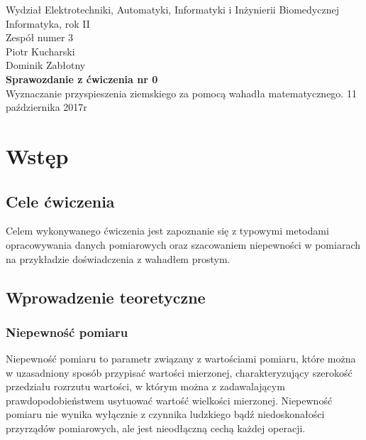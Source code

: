 \documentclass[a4paper,12pts]{article}
\begin{document}
	\thispagestyle{empty}
	\begin{flushleft}
		Wydział Elektrotechniki, Automatyki, Informatyki i Inżynierii Biomedycznej \\
		Informatyka, rok II \\
		Zespół numer 3 \\
		Piotr Kucharski \\
		Dominik Zabłotny \\
		\vspace*{\fill}
		{\large \textbf{Sprawozdanie z ćwiczenia nr 0} } \\
		Wyznaczanie przyspieszenia ziemskiego za pomocą wahadła matematycznego.		
		\vfill	
		11 października 2017r
	\end{flushleft}
	
	\newpage
	
	
	\section{Wstęp}
	
		\subsection{Cele ćwiczenia}
		Celem wykonywanego ćwiczenia jest zapoznanie się z typowymi metodami opracowywania danych pomiarowych oraz szacowaniem niepewności w pomiarach na przykładzie doświadczenia z wahadłem prostym.
	
		\subsection{Wprowadzenie teoretyczne}
	
			\subsubsection{Niepewność pomiaru}
			Niepewność pomiaru to parametr związany z wartościami pomiaru, które można w uzasadniony sposób przypisać wartości mierzonej, charakteryzujący szerokość przedziału rozrzutu wartości, w którym można z zadawalającym prawdopodobieństwem usytuować wartość wielkości mierzonej. Niepewność pomiaru nie wynika wyłącznie z czynnika ludzkiego bądź niedoskonałości przyrządów pomiarowych, ale jest nieodłączną cechą każdej operacji.
			
\end{document}
